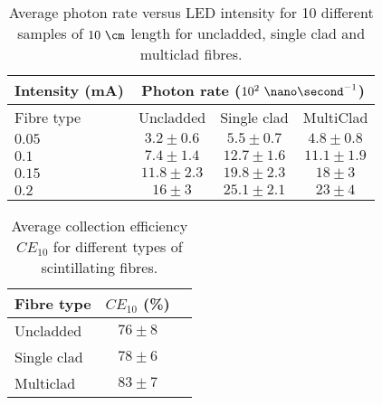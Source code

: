 \begin{table}[htbp]
\centering{}%
\begin{tabular}{lccc}
\toprule 
Intensity (mA) & \multicolumn{3}{c}{Photon rate ($10^{2}~\nano\second^{-1}$)} \tabularnewline
\midrule
Fibre type & Uncladded & Single clad & MultiClad \tabularnewline
\midrule
\midrule
$0.05$ & $3.2 \pm 0.6$ & $5.5 \pm 0.7$ & $4.8 \pm 0.8$ \tabularnewline
$0.1$ & $7.4 \pm 1.4$ & $12.7 \pm 1.6$ & $11.1 \pm 1.9$ \tabularnewline
$0.15$ & $11.8 \pm 2.3$ & $19.8 \pm 2.3$ & $18\pm 3$ \tabularnewline
$0.2$ & $16 \pm 3$ & $25.1 \pm 2.1$ & $23 \pm 4$ \tabularnewline
\bottomrule
\end{tabular}
\caption{Average photon rate versus LED intensity for 10 different samples of $10~\cm$ length for uncladded, single clad and multiclad fibres.}
\label{tab:10DifferentSamplesAlltypes}
\end{table}


\begin{table}[htbp]
\centering{}%
\begin{tabular}{lcc}
\toprule 
Fibre type & $CE_{10}$ (\%) \tabularnewline
\midrule
\midrule 
Uncladded & $76 \pm 8$ \tabularnewline
Single clad & $78 \pm 6$ \tabularnewline
Multiclad & $83 \pm 7$ \tabularnewline
\bottomrule
\end{tabular}
\caption{Average collection efficiency $CE_{10}$ for different types of scintillating fibres.}
\label{tab:CollectionEfficiencyOfFibers}
\end{table}




